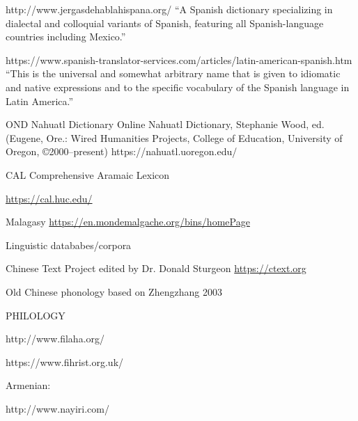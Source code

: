 http://www.jergasdehablahispana.org/ ``A Spanish dictionary specializing in dialectal and colloquial variants of Spanish, featuring all Spanish-language countries including Mexico.''

https://www.spanish-translator-services.com/articles/latin-american-spanish.htm
``This is the universal and somewhat arbitrary name that is given to idiomatic and native expressions and to the specific vocabulary of the Spanish language in Latin America.''

OND Nahuatl Dictionary
Online Nahuatl Dictionary, Stephanie Wood, ed. (Eugene, Ore.: Wired Humanities Projects, College of Education, University of Oregon, ©2000–present)
https://nahuatl.uoregon.edu/
\parencite{wood_online_2000}

CAL Comprehensive Aramaic Lexicon

\url{https://cal.huc.edu/}

Malagasy
\url{https://en.mondemalgache.org/bins/homePage}


Linguistic datababes/corpora

Chinese Text Project edited by Dr. Donald Sturgeon \url{https://ctext.org}


Old Chinese phonology based on Zhengzhang 2003

PHILOLOGY

http://www.filaha.org/

https://www.fihrist.org.uk/

Armenian:

http://www.nayiri.com/






